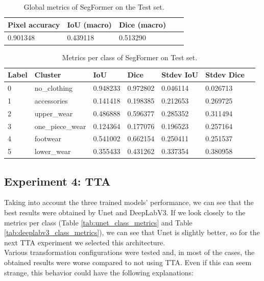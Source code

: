 \documentclass[12pt,a4paper]{article}
\begin{document}
\begin{table}[H]
\scriptsize
\begin{tabularx}{\textwidth}{llXXX}
\toprule
\textbf{Pixel accuracy} & \textbf{IoU (macro)} & \textbf{Dice (macro)} \\
\midrule
0.901348 & 0.439118 & 0.513290 \\
\bottomrule
\end{tabularx}
\caption{Global metrics of SegFormer on the Test set.}
\label{tab:segformer_glob_metrics}
\end{table}

\begin{table}[H]
\scriptsize
\begin{tabularx}{\textwidth}{llXXXXX}
\toprule
\textbf{Label} & \textbf{Cluster} & \textbf{IoU} & \textbf{Dice} & \textbf{Stdev IoU} & \textbf{Stdev Dice} \\
\midrule
0 & no\_clothing & 0.948233 & 0.972802 & 0.046114 & 0.026713 \\
\midrule
1 & accessories & 0.141418 & 0.198385 & 0.212653 & 0.269725 \\
\midrule
2 & upper\_wear & 0.486888 & 0.596377 & 0.285352 & 0.311494 \\
\midrule
3 & one\_piece\_wear & 0.124364 & 0.177076 & 0.196523 & 0.257164 \\
\midrule
4 & footwear & 0.541002 & 0.662154 & 0.250411 & 0.251537 \\
\midrule
5 & lower\_wear & 0.355433 & 0.431262 & 0.337354 & 0.380958 \\
\bottomrule
\end{tabularx}
\caption{Metrics per class of SegFormer on Test set.}
\label{tab:segformer_class_metrics}
\end{table}

\subsection{Experiment 4: TTA}

Taking into account the three trained models' performance, we can see that the best results were obtained by Unet and DeepLabV3. If we look closely to the metrics per class (Table \ref{tab:unet_class_metrics} and Table \ref{tab:deeplabv3_class_metrics}), we can see that Unet is slightly better, so for the next TTA experiment we selected this architecture.\\

Various transformation configurations were tested and, in most of the cases, the obtained results were worse compared to not using TTA. Even if this can seem strange, this behavior could have the following explanations:
\end{document}
